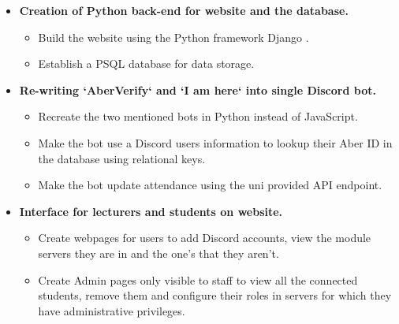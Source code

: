 \begin{itemize}
	\item \textbf{Creation of Python back-end for website and the database.}
	\begin{itemize}
		\item Build the website using the Python framework Django \cite{Django}.
		\item Establish a PSQL \cite{psql} database for data storage.
	\end{itemize}
	
	\item \textbf{Re-writing `AberVerify` and `I am here` into single Discord bot.}
	\begin{itemize}
		\item Recreate the two mentioned bots in Python instead of JavaScript.
		\item Make the bot use a Discord users information to lookup their Aber ID in the database using relational keys.
		\item Make the bot update attendance using the uni provided API endpoint.
	\end{itemize}
	
	\item \textbf{Interface for lecturers and students on website.}
	\begin{itemize}
		\item Create webpages for users to add Discord accounts, view the module servers they are in and the one's that they aren't. 
		\item Create Admin pages only visible to staff to view all the connected students, remove them and configure their roles in servers for which they have administrative privileges.
	\end{itemize}
	

\end{itemize}
